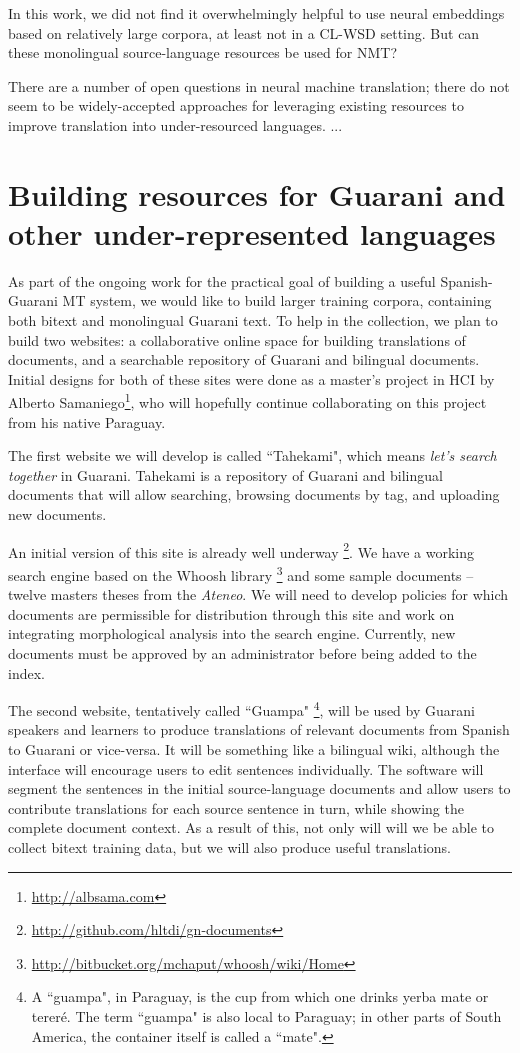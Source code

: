In this work, we did not find it overwhelmingly helpful to use neural
embeddings based on relatively large corpora, at least not in a CL-WSD setting.
But can these monolingual source-language resources be used for NMT?

There are a number of open questions in neural machine translation; there do
not seem to be widely-accepted approaches for leveraging existing resources to
improve translation into under-resourced languages. ... %


\section{Building resources for Guarani and other under-represented languages}
\label{sec:crowdsourcing}

As part of the ongoing work for the practical goal of building a useful
Spanish-Guarani MT system, we would like to build larger training corpora,
containing both bitext and monolingual Guarani text.
To help in the collection, we plan to build two websites:
a collaborative online space for building translations of documents, 
and a searchable repository of Guarani and bilingual documents.
Initial designs for both of these sites were done as a master's project in HCI
by Alberto Samaniego\footnote{\url{http://albsama.com}}, who will hopefully
continue collaborating on this project from his native Paraguay.

The first website we will develop is called ``Tahekami", which means
\emph{let's search together} in Guarani.
Tahekami is a repository of Guarani and bilingual documents that will allow
searching, browsing documents by tag, and uploading new documents.

An initial version of this site is already well underway
\footnote{\url{http://github.com/hltdi/gn-documents}}.  We have a working
search engine based on the Whoosh library
\footnote{\url{http://bitbucket.org/mchaput/whoosh/wiki/Home}} and some sample
documents -- twelve masters theses from the \emph{Ateneo}. We will need to
develop policies for which documents are permissible for distribution through
this site and work on integrating morphological analysis into the search
engine. Currently, new documents must be approved by an administrator before
being added to the index.

The second website, tentatively called ``Guampa"
\footnote{A ``guampa", in Paraguay, is the cup from which one drinks yerba mate
or tereré. The term ``guampa" is also local to Paraguay; in other parts of
South America, the container itself is called a ``mate".},
will be used by Guarani speakers and learners to produce translations of
relevant documents from Spanish to Guarani or vice-versa.
It will be something like a bilingual wiki, although the interface will
encourage users to edit sentences individually.
The software will segment the sentences in the initial
source-language documents and allow users to contribute translations for each
source sentence in turn, while showing the complete document context.
As a result of this, not only will will we be able to collect bitext training
data, but we will also produce useful translations.

